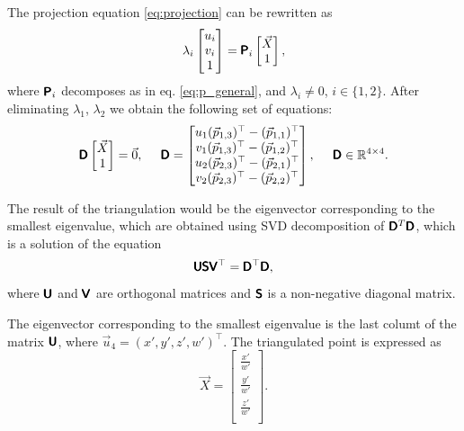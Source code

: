 The projection equation \eqref{eq:projection} can be rewritten as
\begin{equation}
    \lambda_i \begin{bmatrix} 
        u_i \\ v_i \\ 1 \end{bmatrix} = \pmb{\mathsf{P}}_i
    \begin{bmatrix} \vec{X} \\ 1
    \end{bmatrix},
\end{equation} 
where $\pmb{\mathsf{P}}_i$ decomposes as in eq. \eqref{eq:p_general}, and $\lambda_i \neq 0$, $i \in \{1, 2\}$.
After eliminating $\lambda_1$, $\lambda_2$ we obtain the following set of equations:
\begin{equation}
    \pmb{\mathsf{D}} \begin{bmatrix} \vec{X} \\ 1 \end{bmatrix} = \vec{0}, \;\;\;\;\;
    \pmb{\mathsf{D}} = \begin{bmatrix}
        u_1 (\vec{p}_{1, 3})^\top - (\vec{p}_{1, 1})^\top \\
        v_1 (\vec{p}_{1, 3})^\top - (\vec{p}_{1, 2})^\top \\
        u_2 (\vec{p}_{2, 3})^\top - (\vec{p}_{2, 1})^\top \\
        v_2 (\vec{p}_{2, 3})^\top - (\vec{p}_{2, 2})^\top \\
    \end{bmatrix}, \;\;\;\;\; \pmb{\mathsf{D}} \in \mathbb{R}^{4 \times 4}.
\end{equation}

The result of the triangulation would be the eigenvector corresponding to the smallest eigenvalue, which are obtained using SVD decomposition of $\pmb{\mathsf{D}}^T\pmb{\mathsf{D}}$, which is a solution of the equation
\begin{equation}
    \pmb{\mathsf{U}}\pmb{\mathsf{S}}\pmb{\mathsf{V}}^\top = \pmb{\mathsf{D}}^\top\pmb{\mathsf{D}},
\end{equation}
where $\pmb{\mathsf{U}}$ and $\pmb{\mathsf{V}}$ are orthogonal matrices and $\pmb{\mathsf{S}}$ is a non-negative diagonal matrix.

The eigenvector corresponding to the smallest eigenvalue is the last columt of the matrix $\pmb{\mathsf{U}}$, where $\vec{u}_4 = (x', y', z', w')^\top$.
The triangulated point is expressed as
\begin{equation}
    \vec{X} = \begin{bmatrix}
        \frac{x'}{w'} \\
        \frac{y'}{w'} \\
        \frac{z'}{w'} \\
    \end{bmatrix}.
\end{equation}



